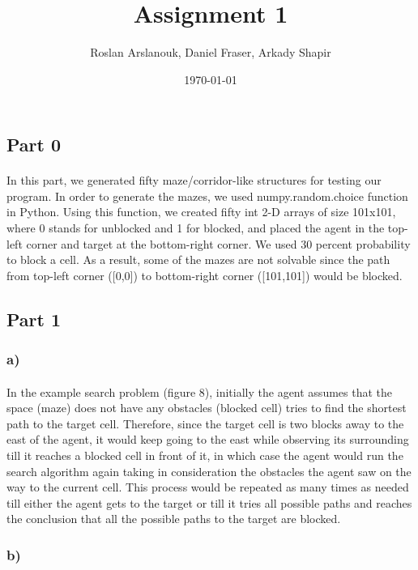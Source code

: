 \documentclass{article}
\title{Assignment 1}
\author{Roslan Arslanouk,
		Daniel Fraser,
        Arkady Shapir}
\date\today
\begin{document}
\maketitle
\subsection*{Part 0}
\paragraph*{}
In this part, we generated fifty maze/corridor-like structures for testing our program. In order to generate the mazes, we used numpy.random.choice function in Python. Using this function, we created fifty int 2-D arrays of size 101x101, where 0 stands for unblocked and 1 for blocked, and placed the agent in the top-left corner and target at the bottom-right corner. We used 30 percent probability to block a cell. As a result, some of the mazes are not solvable since the path from top-left corner ([0,0]) to bottom-right corner ([101,101]) would be blocked.\par

\subsection*{Part 1}
\subsubsection*{a)}
\paragraph*{}
In the example search problem (figure 8), initially the agent assumes that the space (maze) does not have any obstacles (blocked cell) tries to find the shortest path to the target cell. Therefore, since the target cell is two blocks away to the east of the agent, it would keep going to the east while observing its surrounding till it reaches a blocked cell in front of it, in which case the agent would run the search algorithm again taking in consideration the obstacles the agent saw on the way to the current cell. This process would be repeated as many times as needed till either the agent gets to the target or till it tries all possible paths and reaches the conclusion that all the possible paths to the target are blocked.\par

\subsubsection*{b)}
\end{document}
